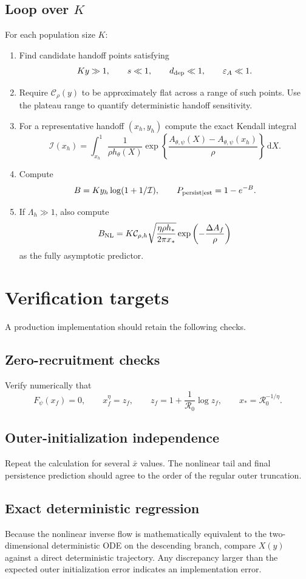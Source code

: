 \documentclass[11pt]{article}
\newcommand{\Rzero}{\mathcal R_0}
\newcommand{\hth}{h_\theta}
\newcommand{\Fpsi}{F_\psi}
\newcommand{\Apsi}{A_{\theta,\psi}}
\newcommand{\xf}{x_f}
\newcommand{\xs}{x_*}
\newcommand{\dd}{\,\mathrm{d}}
\newcommand{\CalC}{\mathcal C_\rho}
\newcommand{\epsA}{\varepsilon_A}
\begin{document}
\subsection{Loop over \texorpdfstring{$K$}{K}}
For each population size $K$:
\begin{enumerate}
\item Find candidate handoff points satisfying
\[
Ky\gg1,
\qquad
s\ll1,
\qquad
d_{\rm dep}\ll1,
\qquad
\epsA\ll1.
\]
\item Require $\CalC(y)$ to be approximately flat across a range of such points. Use the plateau range to quantify deterministic handoff sensitivity.
\item For a representative handoff $(x_h,y_h)$ compute the exact Kendall integral
\[
\mathcal I(x_h)
=\int_{x_h}^{1}
\frac1{\rho\hth(X)}
\exp\left\{\frac{\Apsi(X)-\Apsi(x_h)}\rho\right\}\dd X.
\]
\item Compute
\[
B=Ky_h\log(1+1/\mathcal I),
\qquad
P_{\rm persist\mid est}=1-e^{-B}.
\]
\item If $\Lambda_h\gg1$, also compute
\[
B_{\rm NL}
=K\mathcal C_{\rho,h}
\sqrt{\frac{\eta\rho h_*}{2\pi\xs}}
\exp\left(-\frac{\Delta A_f}{\rho}\right)
\]
as the fully asymptotic predictor.
\end{enumerate}

\section{Verification targets}

A production implementation should retain the following checks.

\subsection{Zero-recruitment checks}
Verify numerically that
\[
\Fpsi(\xf)=0,
\qquad
\xf^\eta=z_f,
\qquad
z_f=1+\frac1{\Rzero}\log z_f,
\qquad
\xs=\Rzero^{-1/\eta}.
\]

\subsection{Outer-initialization independence}
Repeat the calculation for several $\bar x$ values. The nonlinear tail and final persistence prediction should agree to the order of the regular outer truncation.

\subsection{Exact deterministic regression}
Because the nonlinear inverse flow is mathematically equivalent to the two-dimensional deterministic ODE on the descending branch, compare $X(y)$ against a direct deterministic trajectory. Any discrepancy larger than the expected outer initialization error indicates an implementation error.
\end{document}
